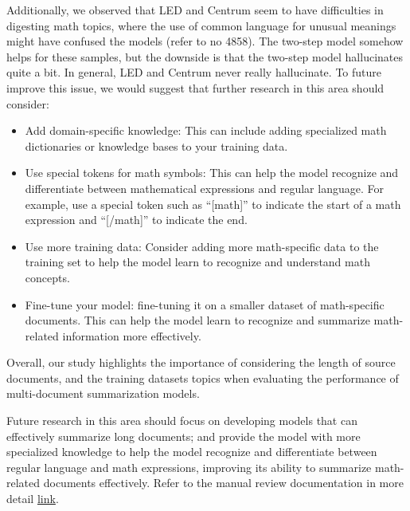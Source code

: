 \documentclass[12pt, twocolumn]{article}
\numberwithin{equation}{section}
\begin{document}
Additionally, we observed that LED and Centrum seem to have difficulties in digesting math topics, where the use of common language for unusual meanings might have confused the models (refer to no 4858).  The two-step model somehow helps for these samples, but the downside is that the two-step model hallucinates quite a bit. In general, LED and Centrum never really hallucinate. To future improve this issue, we would suggest that further research in this area should consider:

\begin{itemize}
    \item Add domain-specific knowledge: This can include adding specialized math dictionaries or knowledge bases to your training data. 
    \item Use special tokens for math symbols: This can help the model recognize and differentiate between mathematical expressions and regular language. For example, use a special token such as ``[math]'' to indicate the start of a math expression and ``[/math]'' to indicate the end.
    \item Use more training data: Consider adding more math-specific data to the training set to help the model learn to recognize and understand math concepts.
    \item Fine-tune your model: fine-tuning it on a smaller dataset of math-specific documents. This can help the model learn to recognize and summarize math-related information more effectively.
\end{itemize}

Overall, our study highlights the importance of considering the length of source documents, and the training datasets topics when evaluating the performance of multi-document summarization models. 

Future research in this area should focus on developing models that can effectively summarize long documents; and provide the model with more specialized knowledge to help the model recognize and differentiate between regular language and math expressions, improving its ability to summarize math-related documents effectively. Refer to the manual review documentation in more detail \href{https://drive.google.com/file/d/1sPLj4a-rafh1EjOR7l_QMveexfoaxq3y/view?usp=share_link}{link}.

{
    \footnotesize
    
    
}
\end{document}
